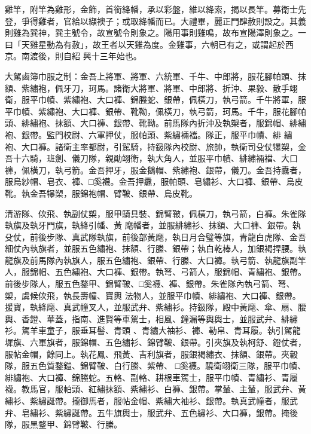 \begin{pinyinscope}
 雞竿，附竿為雞形，金飾，首銜絳幡，承以彩盤，維以絳索，揭以長竿。募衛士先登，爭得雞者，官給以纈襖子；或取絳幡而已。大禮畢，麗正門肆赦則設之。其義則雞為巽神，巽主號令，故宣號令則象之。陽用事則雞鳴，故布宣陽澤則象之。一曰「天雞星動為有赦」，故王者以天雞為度。金雞事，六朝已有之，或謂起於西京。南渡後，則自紹
 興十三年始也。



 大駕鹵簿巾服之制：金吾上將軍、將軍、六統軍、千牛、中郎將，服花腳帕頭、抹額、紫繡袍，佩牙刀，珂馬。諸衛大將軍、將軍、中郎將、折沖、果毅、散手翊衛，服平巾幘、紫繡袍、大口褲、錦螣蛇、銀帶，佩橫刀，執弓箭。千牛將軍，服平巾幘、紫繡袍、大口褲、銀帶、靴靿，佩橫刀，執弓箭，珂馬。千牛，服花腳帕頭、緋繡袍、抹額、大口褲、銀帶、靴靿。前馬隊內折沖及執槊者，服錦帽、緋繡袍、銀帶。監門校尉、六軍押仗，服帕頭、紫繡裲襠。隊正，服平巾幘、緋
 繡袍、大口褲。諸衛主率都尉，引駕騎，持鈒隊內校尉、旅帥，執衛司殳仗犦槊，金吾十六騎，班劍、儀刀隊，親勛翊衛，執大角人，並服平巾幘、緋繡裲襠、大口褲，佩橫刀，執弓箭。金吾押牙，服金鵝帽、紫繡袍、銀帶，儀刀。金吾持纛者，服烏紗帽、皂衣、褲、□奚襪。金吾押纛，服帕頭、皂繡衫、大口褲、銀帶、烏皮靴。執金吾犦槊，服錦袍帽、臂鞁、銀帶、烏皮靴。


清游隊、佽飛、執副仗槊，服甲騎具裝、錦臂鞁，佩橫刀，執弓箭，白褲。朱雀隊執旗及執牙門旗，執絳引幡、黃
 麾幡者，並服緋繡衫、抹額、大口褲、銀帶。執殳仗，前後步隊、真武隊執旗，前後部黃麾，執日月合璧等旗，青龍白虎隊、金吾細仗內執旗者，並服五色繡袍、抹額、行縢、銀帶；執白乾棒人，加銀褐捍腰。執龍旗及前馬隊內執旗人，服五色繡袍、銀帶、行縢、大口褲。執弓箭、執龍旗副竿人，服錦帽、五色繡袍、大口褲、銀帶。執弩、弓箭人，服錦帽、青繡袍、銀帶。前後步隊人，服五色鍪甲、錦臂鞁、□奚襪、褲、銀帶。朱雀隊內執弓箭、弩、槊，虞候佽飛，執長壽幢、寶輿
 法物人，並服平巾幘、緋繡袍、大口褲、銀帶。援寶，執絳麾、真武幢叉人，並服武弁、紫繡衫。持鈒隊，殿中黃麾、傘、扇、腰輿、香鐙、華蓋，指南、進賢等車駕士，相風、鐘漏等輿輿士，並服武弁、緋繡衫。駕羊車童子，服垂耳髻、青頭
 、青繡大袖衫、褲、勒帛、青耳履。執引駕龍墀旗、六軍旗者，服錦帽、五色繡衫、錦臂鞁、銀帶。引夾旗及執柯舒、鐙仗者，服帖金帽，餘同上。執花鳳、飛黃、吉利旗者，服銀褐繡衣、抹額、銀帶。夾轂隊，服五色質鍪鎧、錦臂鞁、白行縢、紫帶、
 □奚襪。驍衛翊衛三隊，服平巾幘、緋繡袍、大口褲、錦螣蛇。五輅、副輅、耕根車駕士，服平巾幘、青繡衫、青履襪。教馬官，服帕頭、紅繡抹額、紫繡衫、白褲、銀帶。掌輦、主輦，服武弁、黃繡衫、紫繡誕帶。攏御馬者，服帖金帽、紫繡大袖衫、銀帶。執真武幢者，服武弁、皂繡衫、紫繡誕帶。五牛旗輿士，服武弁、五色繡衫、大口褲，銀帶。掩後隊，服黑鍪甲、錦臂鞁、行縢。




\end{pinyinscope}
